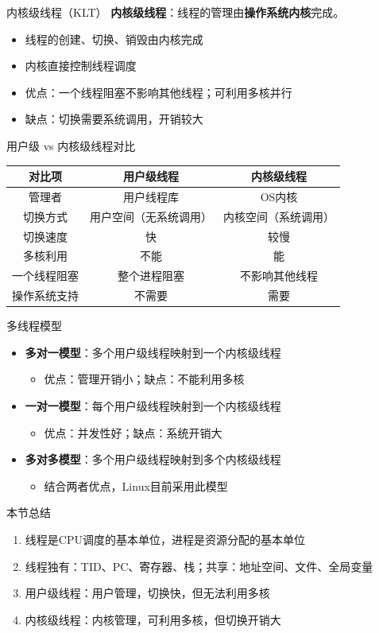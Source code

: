 \documentclass[10pt, aspectratio=169]{beamer}
\begin{document}
\begin{frame}{内核级线程（KLT）}
    \textbf{内核级线程}：线程的管理由\textbf{操作系统内核}完成。

    \begin{itemize}
        \item 线程的创建、切换、销毁由内核完成
        \item 内核直接控制线程调度
        \item 优点：一个线程阻塞不影响其他线程；可利用多核并行
        \item 缺点：切换需要系统调用，开销较大
    \end{itemize}
\end{frame}

\begin{frame}{用户级 vs 内核级线程对比}
    \begin{tabular}{|c|c|c|}
        \hline
        对比项 & 用户级线程 & 内核级线程 \\
        \hline
        管理者 & 用户线程库 & OS内核 \\
        切换方式 & 用户空间（无系统调用） & 内核空间（系统调用） \\
        切换速度 & 快 & 较慢 \\
        多核利用 & 不能 & 能 \\
        一个线程阻塞 & 整个进程阻塞 & 不影响其他线程 \\
        操作系统支持 & 不需要 & 需要 \\
        \hline
    \end{tabular}
\end{frame}

\begin{frame}{多线程模型}
    \begin{itemize}
        \item \textbf{多对一模型}：多个用户级线程映射到一个内核级线程
        \begin{itemize}
            \item 优点：管理开销小；缺点：不能利用多核
        \end{itemize}
        \item \textbf{一对一模型}：每个用户级线程映射到一个内核级线程
        \begin{itemize}
            \item 优点：并发性好；缺点：系统开销大
        \end{itemize}
        \item \textbf{多对多模型}：多个用户级线程映射到多个内核级线程
        \begin{itemize}
            \item 结合两者优点，Linux目前采用此模型
        \end{itemize}
    \end{itemize}
\end{frame}

\begin{frame}{本节总结}
    \begin{enumerate}
        \item 线程是CPU调度的基本单位，进程是资源分配的基本单位
        \item 线程独有：TID、PC、寄存器、栈；共享：地址空间、文件、全局变量
        \item 用户级线程：用户管理，切换快，但无法利用多核
        \item 内核级线程：内核管理，可利用多核，但切换开销大
    \end{enumerate}
\end{frame}
\end{document}
